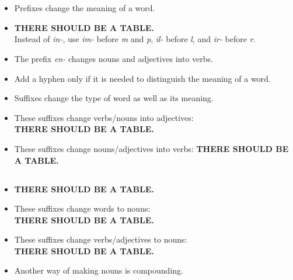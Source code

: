 \section{}

\subsection{}
\begin{itemize}
    \item[\doot] Prefixes change the meaning of a word.
    \item[\doot] \textbf{THERE SHOULD BE A TABLE.}\\
    Instead of \textit{in-}, use \textit{im-} before \textit{m} and \textit{p},
    \textit{il-} before \textit{l}, and \textit{ir-} before \textit{r}.
    \item[\aast] The prefix \textit{en-} changes nouns and adjectives into verbs.
    \item[\doot] Add a hyphen only if it is needed to distinguish the meaning of a word.
    \item[\doot] Suffixes change the type of word as well as its meaning.
    \item[\doot] These suffixes change verbs/nouns into adjectives:\\
    \textbf{THERE SHOULD BE A TABLE.}
    \item[\doot] These suffixes change nouns/adjectives into verbs:
    \textbf{THERE SHOULD BE A TABLE.}
\end{itemize}

\subsection{}
\begin{itemize}
    \item[\doot]\textbf{THERE SHOULD BE A TABLE.}
    \item[\doot] These suffixes change words to nouns:\\
    \textbf{THERE SHOULD BE A TABLE.}
    \item[\doot] These suffixes change verbs/adjectives to nouns:\\
    \textbf{THERE SHOULD BE A TABLE.}
    \item[\doot] Another way of making nouns is compounding.
\end{itemize}
